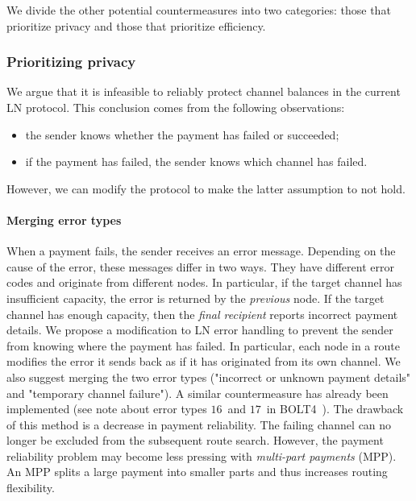 We divide the other potential countermeasures into two categories: those that prioritize privacy and those that prioritize efficiency.


\subsubsection*{Prioritizing privacy}

We argue that it is infeasible to reliably protect channel balances in the current LN protocol.
This conclusion comes from the following observations:
\begin{itemize}
	\item the sender knows whether the payment has failed or succeeded;
	\item if the payment has failed, the sender knows which channel has failed.
\end{itemize}
However, we can modify the protocol to make the latter assumption to not hold.

\paragraph{Merging error types}
When a payment fails, the sender receives an error message.
Depending on the cause of the error, these messages differ in two ways.
They have different error codes and originate from different nodes.
In particular, if the target channel has insufficient capacity, the error is returned by the \textit{previous} node.
If the target channel has enough capacity, then the \textit{final recipient} reports incorrect payment details.
We propose a modification to LN error handling to prevent the sender from knowing where the payment has failed.
In particular, each node in a route modifies the error it sends back as if it has originated from its own channel.
We also suggest merging the two error types ("incorrect or unknown payment details" and "temporary channel failure").
A similar countermeasure has already been implemented (see note about error types $16$~and $17$~in BOLT4~\cite{Bolt4OnionRouting}).
The drawback of this method is a decrease in payment reliability.
The failing channel can no longer be excluded from the subsequent route search.
However, the payment reliability problem may become less pressing with \textit{multi-part payments} (MPP).
An MPP splits a large payment into smaller parts and thus increases routing flexibility.

